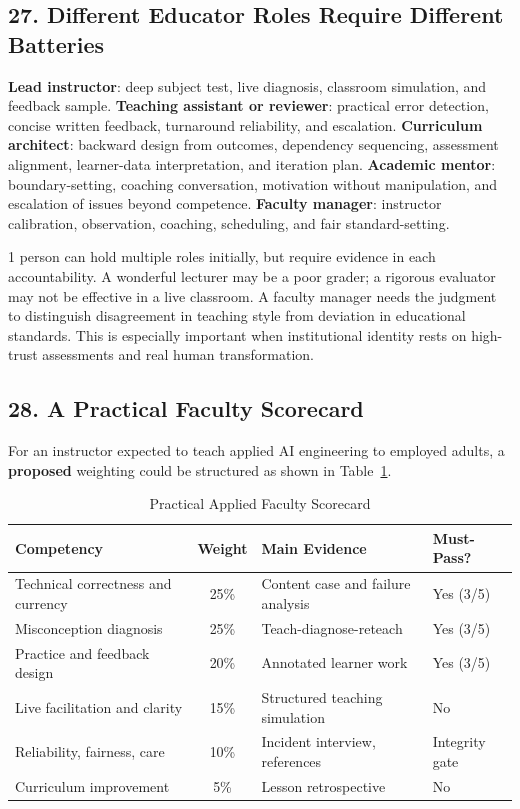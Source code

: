 \subsection*{27. Different Educator Roles Require Different Batteries}

\textbf{Lead instructor}: deep subject test, live diagnosis, classroom simulation, and feedback sample. \textbf{Teaching assistant or reviewer}: practical error detection, concise written feedback, turnaround reliability, and escalation. \textbf{Curriculum architect}: backward design from outcomes, dependency sequencing, assessment alignment, learner-data interpretation, and iteration plan. \textbf{Academic mentor}: boundary-setting, coaching conversation, motivation without manipulation, and escalation of issues beyond competence. \textbf{Faculty manager}: instructor calibration, observation, coaching, scheduling, and fair standard-setting.

1 person can hold multiple roles initially, but require evidence in each accountability. A wonderful lecturer may be a poor grader; a rigorous evaluator may not be effective in a live classroom. A faculty manager needs the judgment to distinguish disagreement in teaching style from deviation in educational standards. This is especially important when institutional identity rests on high-trust assessments and real human transformation.

\subsection*{28. A Practical Faculty Scorecard}

For an instructor expected to teach applied AI engineering to employed adults, a \textbf{proposed} weighting could be structured as shown in Table~\ref{tab:faculty_scorecard}.

\begin{table}[htbp]
\centering
\small
\caption{Practical Applied Faculty Scorecard}
\label{tab:faculty_scorecard}
\begin{tabularx}{\columnwidth}{p{2.6cm} c X p{1.6cm}}
\toprule
\textbf{Competency} & \textbf{Weight} & \textbf{Main Evidence} & \textbf{Must-Pass?} \\
\midrule
Technical correctness and currency & 25\% & Content case and failure analysis & Yes (3/5) \\
Misconception diagnosis & 25\% & Teach-diagnose-reteach & Yes (3/5) \\
Practice and feedback design & 20\% & Annotated learner work & Yes (3/5) \\
Live facilitation and clarity & 15\% & Structured teaching simulation & No \\
Reliability, fairness, care & 10\% & Incident interview, references & Integrity gate \\
Curriculum improvement & 5\% & Lesson retrospective & No \\
\bottomrule
\end{tabularx}
\end{table}


